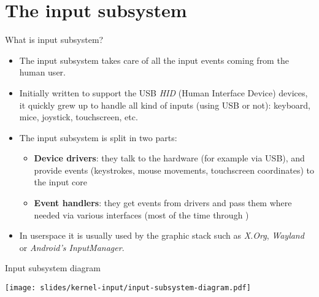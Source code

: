 \section{The input subsystem}

\begin{frame}{What is input subsystem?}
  \begin{itemize}
  \item The input subsystem takes care of all the input events coming
    from the human user.
  \item Initially written to support the USB {\em HID} (Human
    Interface Device) devices, it quickly grew up to handle all kind
    of inputs (using USB or not): keyboard, mice, joystick,
    touchscreen, etc.
  \item The input subsystem is split in two parts:
    \begin{itemize}
    \item {\bf Device drivers}: they talk to the hardware (for example
      via USB), and provide events (keystrokes, mouse movements,
      touchscreen coordinates) to the input core
    \item {\bf Event handlers}: they get events from drivers and pass
      them where needed via various interfaces (most of the time
      through )
    \end{itemize}
  \item In userspace it is usually used by the graphic stack such
    as {\em X.Org}, {\em Wayland} or {\em Android's InputManager}.
  \end{itemize}
\end{frame}

\begin{frame}{Input subsystem diagram}
  \begin{center}
    \texttt{[image: slides/kernel-input/input-subsystem-diagram.pdf]}
  \end{center}
\end{frame}

